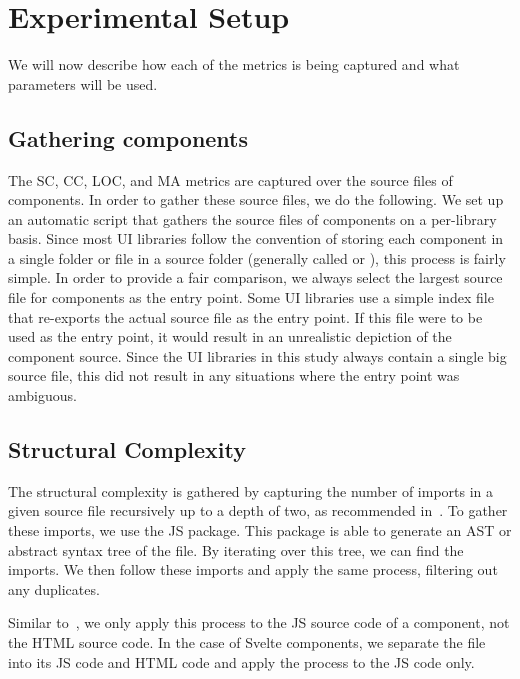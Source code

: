 \chapter{Experimental Setup}\label{chap:experimental-setup}
We will now describe how each of the metrics is being captured and what parameters will be used.

\section{Gathering components}\label{sec:experimental-setup:gathering-components}
The SC, CC, LOC, and MA metrics are captured over the source files of components. In order to gather these source files, we do the following. We set up an automatic script that gathers the source files of components on a per-library basis. Since most UI libraries follow the convention of storing each component in a single folder or file in a source folder (generally called  or ), this process is fairly simple. In order to provide a fair comparison, we always select the largest source file for components as the entry point. Some UI libraries use a simple index file that re-exports the actual source file as the entry point. If this file were to be used as the entry point, it would result in an unrealistic depiction of the component source. Since the UI libraries in this study always contain a single big source file, this did not result in any situations where the entry point was ambiguous.

\section{Structural Complexity}
The structural complexity is gathered by capturing the number of imports in a given source file recursively up to a depth of two, as recommended in~\cite{martinez-ortiz2016quality}. To gather these imports, we use the  JS package. This package is able to generate an AST or abstract syntax tree of the file. By iterating over this tree, we can find the imports. We then follow these imports and apply the same process, filtering out any duplicates.

Similar to~\cite{martinez-ortiz2016quality}, we only apply this process to the JS source code of a component, not the HTML source code. In the case of Svelte components, we separate the file into its JS code and HTML code and apply the process to the JS code only.


